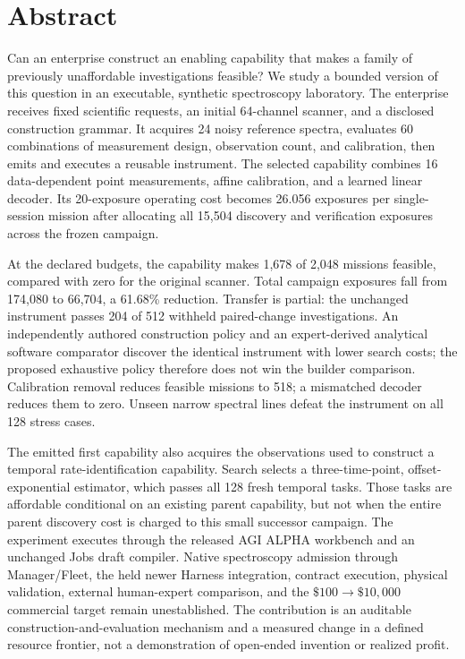 \documentclass[11pt,a4paper]{article}
\begin{document}
\section*{Abstract}
Can an enterprise construct an enabling capability that makes a family of previously unaffordable investigations feasible? We study a bounded version of this question in an executable, synthetic spectroscopy laboratory. The enterprise receives fixed scientific requests, an initial 64-channel scanner, and a disclosed construction grammar. It acquires 24 noisy reference spectra, evaluates 60 combinations of measurement design, observation count, and calibration, then emits and executes a reusable instrument. The selected capability combines 16 data-dependent point measurements, affine calibration, and a learned linear decoder. Its 20-exposure operating cost becomes 26.056 exposures per single-session mission after allocating all 15,504 discovery and verification exposures across the frozen campaign.

At the declared budgets, the capability makes 1,678 of 2,048 missions feasible, compared with zero for the original scanner. Total campaign exposures fall from 174,080 to 66,704, a 61.68\% reduction. Transfer is partial: the unchanged instrument passes 204 of 512 withheld paired-change investigations. An independently authored construction policy and an expert-derived analytical software comparator discover the identical instrument with lower search costs; the proposed exhaustive policy therefore does not win the builder comparison. Calibration removal reduces feasible missions to 518; a mismatched decoder reduces them to zero. Unseen narrow spectral lines defeat the instrument on all 128 stress cases.

The emitted first capability also acquires the observations used to construct a temporal rate-identification capability. Search selects a three-time-point, offset-exponential estimator, which passes all 128 fresh temporal tasks. Those tasks are affordable conditional on an existing parent capability, but not when the entire parent discovery cost is charged to this small successor campaign. The experiment executes through the released AGI ALPHA workbench and an unchanged Jobs draft compiler. Native spectroscopy admission through Manager/Fleet, the held newer Harness integration, contract execution, physical validation, external human-expert comparison, and the \(\$100\rightarrow\$10{,}000\) commercial target remain unestablished. The contribution is an auditable construction-and-evaluation mechanism and a measured change in a defined resource frontier, not a demonstration of open-ended invention or realized profit.
\end{document}
